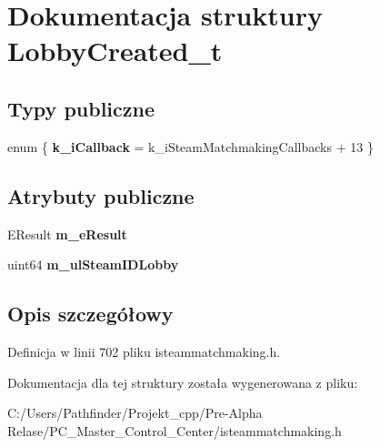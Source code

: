 \hypertarget{struct_lobby_created__t}{}\section{Dokumentacja struktury Lobby\+Created\+\_\+t}
\label{struct_lobby_created__t}
\subsection*{Typy publiczne}
\begin{DoxyCompactItemize}
\item 
\mbox{\label{struct_lobby_created__t_a5b5fef5cb80461e98df33fb6567e9546}} 
enum \{ {\bfseries k\+\_\+i\+Callback} = k\+\_\+i\+Steam\+Matchmaking\+Callbacks + 13
 \}
\end{DoxyCompactItemize}
\subsection*{Atrybuty publiczne}
\begin{DoxyCompactItemize}
\item 
\mbox{\label{struct_lobby_created__t_aaac5ebc0c5ec4b5380035a69260d1038}} 
E\+Result {\bfseries m\+\_\+e\+Result}
\item 
\mbox{\label{struct_lobby_created__t_a25431678732719c0824abf477bb628ce}} 
uint64 {\bfseries m\+\_\+ul\+Steam\+I\+D\+Lobby}
\end{DoxyCompactItemize}


\subsection{Opis szczegółowy}


Definicja w linii 702 pliku isteammatchmaking.\+h.



Dokumentacja dla tej struktury została wygenerowana z pliku\+:\begin{DoxyCompactItemize}
\item 
C\+:/\+Users/\+Pathfinder/\+Projekt\+\_\+cpp/\+Pre-\/\+Alpha Relase/\+P\+C\+\_\+\+Master\+\_\+\+Control\+\_\+\+Center/isteammatchmaking.\+h\end{DoxyCompactItemize}
